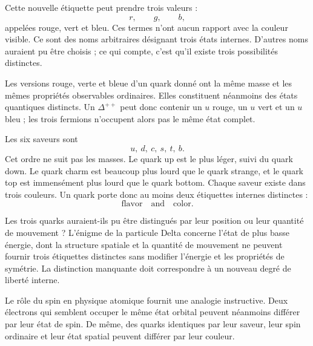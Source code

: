 \begin{classroomqa}
\end{classroomqa}

Cette nouvelle étiquette peut prendre trois valeurs :
\begin{equation}
r,\qquad g,\qquad b,
\end{equation}
appelées rouge, vert et bleu. Ces termes n’ont aucun rapport avec la couleur visible. Ce sont des noms arbitraires désignant trois états internes. D’autres noms auraient pu être choisis ; ce qui compte, c’est qu’il existe trois possibilités distinctes.

Les versions rouge, verte et bleue d’un quark donné ont la même masse et les mêmes propriétés observables ordinaires. Elles constituent néanmoins des états quantiques distincts. Un \(\Delta^{++}\) peut donc contenir un \(u\) rouge, un \(u\) vert et un \(u\) bleu ; les trois fermions n’occupent alors pas le même état complet.

Les six saveurs sont
\begin{equation}
u,\ d,\ c,\ s,\ t,\ b.
\end{equation}
Cet ordre ne suit pas les masses. Le quark up est le plus léger, suivi du quark down. Le quark charm est beaucoup plus lourd que le quark strange, et le quark top est immensément plus lourd que le quark bottom. Chaque saveur existe dans trois couleurs. Un quark porte donc au moins deux étiquettes internes distinctes :
\begin{equation}
\text{flavor}\quad\text{and}\quad\text{color}.
\end{equation}

Les trois quarks auraient-ils pu être distingués par leur position ou leur quantité de mouvement ? L’énigme de la particule Delta concerne l’état de plus basse énergie, dont la structure spatiale et la quantité de mouvement ne peuvent fournir trois étiquettes distinctes sans modifier l’énergie et les propriétés de symétrie. La distinction manquante doit correspondre à un nouveau degré de liberté interne.

Le rôle du spin en physique atomique fournit une analogie instructive. Deux électrons qui semblent occuper le même état orbital peuvent néanmoins différer par leur état de spin. De même, des quarks identiques par leur saveur, leur spin ordinaire et leur état spatial peuvent différer par leur couleur.


